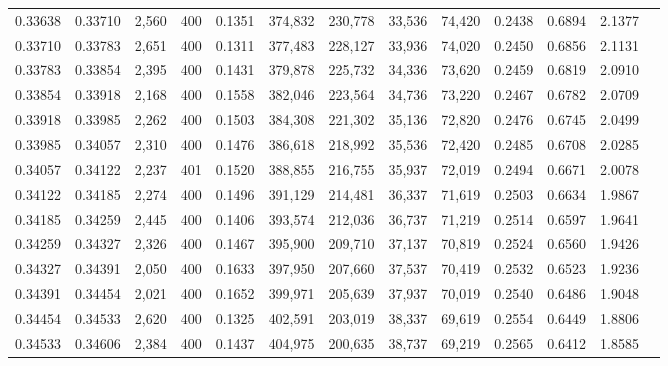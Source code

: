 \begin{tabular}{rrrrrrrrrrrrr}
0.33638 & 0.33710 &  2,560 & 400 &                                     0.1351 & 374,832 & 230,778 &  33,536 &  74,420 & 0.2438 & 0.6894 & 2.1377 \\
0.33710 & 0.33783 &  2,651 & 400 &                                     0.1311 & 377,483 & 228,127 &  33,936 &  74,020 & 0.2450 & 0.6856 & 2.1131 \\
0.33783 & 0.33854 &  2,395 & 400 &                                     0.1431 & 379,878 & 225,732 &  34,336 &  73,620 & 0.2459 & 0.6819 & 2.0910 \\
0.33854 & 0.33918 &  2,168 & 400 &                                     0.1558 & 382,046 & 223,564 &  34,736 &  73,220 & 0.2467 & 0.6782 & 2.0709 \\
0.33918 & 0.33985 &  2,262 & 400 &                                     0.1503 & 384,308 & 221,302 &  35,136 &  72,820 & 0.2476 & 0.6745 & 2.0499 \\
0.33985 & 0.34057 &  2,310 & 400 &                                     0.1476 & 386,618 & 218,992 &  35,536 &  72,420 & 0.2485 & 0.6708 & 2.0285 \\
0.34057 & 0.34122 &  2,237 & 401 &                                     0.1520 & 388,855 & 216,755 &  35,937 &  72,019 & 0.2494 & 0.6671 & 2.0078 \\
0.34122 & 0.34185 &  2,274 & 400 &                                     0.1496 & 391,129 & 214,481 &  36,337 &  71,619 & 0.2503 & 0.6634 & 1.9867 \\
0.34185 & 0.34259 &  2,445 & 400 &                                     0.1406 & 393,574 & 212,036 &  36,737 &  71,219 & 0.2514 & 0.6597 & 1.9641 \\
0.34259 & 0.34327 &  2,326 & 400 &                                     0.1467 & 395,900 & 209,710 &  37,137 &  70,819 & 0.2524 & 0.6560 & 1.9426 \\
0.34327 & 0.34391 &  2,050 & 400 &                                     0.1633 & 397,950 & 207,660 &  37,537 &  70,419 & 0.2532 & 0.6523 & 1.9236 \\
0.34391 & 0.34454 &  2,021 & 400 &                                     0.1652 & 399,971 & 205,639 &  37,937 &  70,019 & 0.2540 & 0.6486 & 1.9048 \\
0.34454 & 0.34533 &  2,620 & 400 &                                     0.1325 & 402,591 & 203,019 &  38,337 &  69,619 & 0.2554 & 0.6449 & 1.8806 \\
0.34533 & 0.34606 &  2,384 & 400 &                                     0.1437 & 404,975 & 200,635 &  38,737 &  69,219 & 0.2565 & 0.6412 & 1.8585 \\

\end{tabular}
